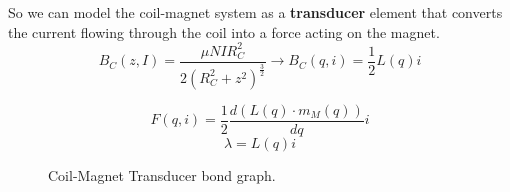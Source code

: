 So we can model the coil-magnet system as a \textbf{transducer} element that converts the current flowing through the coil into a force acting on the magnet.
\begin{equation}
    B_C(z, I) = \frac{\mu N I R_C^2}{2(R_C^2+z^2)^\frac{3}{2}} \rightarrow B_C(q, i) = \frac{1}{2} L(q) i
\end{equation}

\begin{figure}
    \centering
    \resizebox{.7\linewidth}{!}{
        
    }
    \caption{Coil-Magnet Transducer bond graph.}    
    \label{fig: Coil-Magnet_Transducer}
    
    \begin{equation}
        F(q, i) = \frac{1}{2} \frac{d \left(L(q) \cdot m_M(q) \right)}{dq} i
    \end{equation}
    \begin{equation}
        \lambda = L(q) i
    \end{equation}
\end{figure}
